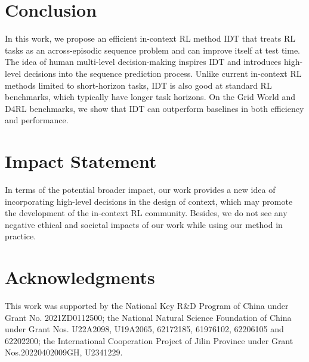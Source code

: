 \section{Conclusion}

In this work, we propose an efficient in-context RL method IDT that treats RL tasks as an across-episodic sequence problem and can improve itself at test time. The idea of human multi-level decision-making inspires IDT and introduces high-level decisions into the sequence prediction process. Unlike current in-context RL methods limited to short-horizon tasks, IDT is also good at standard RL benchmarks, which typically have longer task horizons. On the Grid World and D4RL benchmarks, we show that IDT can outperform baselines in both efficiency and performance.

\section*{Impact Statement}
In terms of the potential broader impact, our work provides a new idea of incorporating high-level decisions in the design of context, which may promote the development of the in-context RL community.
Besides, we do not see any negative ethical and societal impacts of our work while using our method in practice.

\section*{Acknowledgments}
This work was supported by the National Key R\&D Program of China under Grant No. 2021ZD0112500; the National Natural Science Foundation of China under Grant Nos. U22A2098, U19A2065, 62172185, 61976102, 62206105 and 62202200; the International Cooperation Project of Jilin Province under Grant Nos.20220402009GH, U2341229.